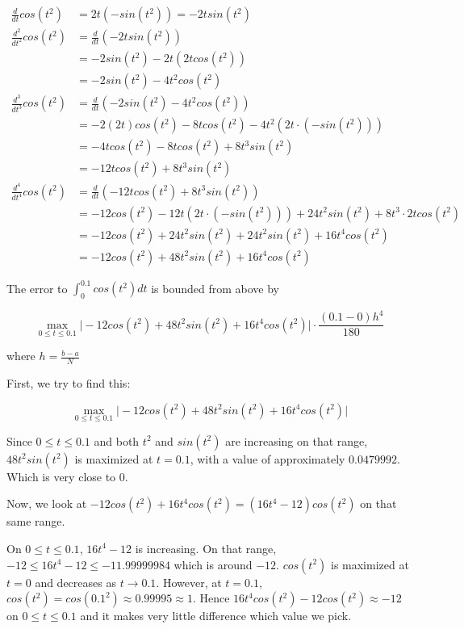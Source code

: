 \documentclass[9pt]{article}
\begin{document}
\begin{align*}
  \frac{d}{dt}cos(t^2) &= 2t(-sin(t^2)) = -2tsin(t^2) \\
  \frac{d^2}{dt^2}cos(t^2) &= \frac{d}{dt}(-2tsin(t^2)) \\
  &= -2sin(t^2) - 2t(2tcos(t^2)) \\
  &= -2sin(t^2) - 4t^2cos(t^2) \\
  \frac{d^3}{dt^3}cos(t^2) &= \frac{d}{dt}(-2sin(t^2) - 4t^2cos(t^2)) \\
  &= -2(2t)cos(t^2) - 8tcos(t^2) - 4t^2(2t \cdot (-sin(t^2))) \\
  &= -4tcos(t^2) - 8tcos(t^2) + 8t^3sin(t^2) \\
  &= -12tcos(t^2) + 8t^3sin(t^2) \\
  \frac{d^4}{dt^4}cos(t^2) &= \frac{d}{dt}(-12tcos(t^2) + 8t^3sin(t^2)) \\
  &= -12cos(t^2) - 12t(2t \cdot (-sin(t^2))) + 24t^2 sin(t^2) + 8t^3 \cdot 2tcos(t^2) \\
  &= -12cos(t^2) + 24t^2sin(t^2) + 24t^2sin(t^2) + 16t^4cos(t^2) \\
  &= -12cos(t^2) + 48t^2sin(t^2) + 16t^4cos(t^2)
\end{align*}

The error to $\int_0^{0.1} cos(t^2) dt$ is bounded from above by

\begin{equation*}
\max_{0 \leq t \leq 0.1} \Big| -12cos(t^2) + 48t^2sin(t^2) + 16t^4cos(t^2) \Big| \cdot \frac{(0.1 - 0)h^4}{180}
\end{equation*}

where $h = \frac{b - a}{N}$

First, we try to find this:

\begin{equation*}
\max_{0 \leq t \leq 0.1} \Big| -12cos(t^2) + 48t^2sin(t^2) + 16t^4cos(t^2) \Big|
\end{equation*}

Since $0 \leq t \leq 0.1$ and both $t^2$ and $sin(t^2)$ are increasing on that range, $48t^2sin(t^2)$ is maximized at $t = 0.1$, with a value of approximately $0.0479992$. Which is very close to 0.

Now, we look at $-12cos(t^2) + 16t^4cos(t^2) = (16t^4 - 12)cos(t^2)$ on that same range.

On $0 \leq t \leq 0.1$, $16t^4 - 12$ is increasing. On that range, $-12 \leq 16t^4 - 12 \leq -11.99999984$ which is around $-12$. $cos(t^2)$ is maximized at $t = 0$ and decreases as $t \rightarrow 0.1$. However, at $t = 0.1$, $cos(t^2) = cos(0.1^2) \approx 0.99995 \approx 1$. Hence $16t^4cos(t^2) - 12cos(t^2) \approx -12$ on $0 \leq t \leq 0.1$ and it makes very little difference which value we pick.
\end{document}
